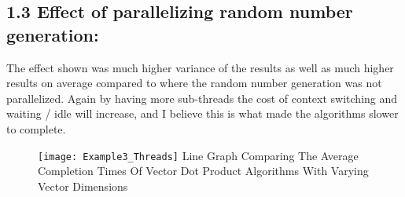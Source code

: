 \documentclass[11pt]{article}
\begin{document}
\begin{page}
\noindent \chapter{1.3 Effect of parallelizing random number generation:}
The effect shown was much higher variance of the results as well as much higher results on average compared to where the random number generation was not parallelized. Again by having more sub-threads the cost of context switching and waiting / idle will increase, and I believe this is what made the algorithms slower to complete.\\

\begin{figure}[ht]
\centering
     \texttt{[image: Example3\_Threads]}
     Line Graph Comparing The Average Completion Times Of Vector Dot Product Algorithms With Varying Vector Dimensions\\
\end{figure}

\end{page}
\end{document}
